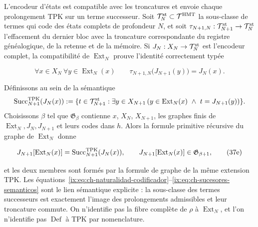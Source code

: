 L’encodeur d’états est compatible avec les troncatures et envoie chaque
prolongement TPK sur un terme successeur. Soit
\(\mathcal T_N^{\rm st}\subset\mathcal T^{\rm HMT}\) la sous-classe de termes
qui code des états complets de profondeur \(N\), et soit
\(\tau_{N+1,N}:\mathcal T_{N+1}^{\rm st}\to\mathcal T_N^{\rm st}\) l’effacement
du dernier bloc avec la troncature correspondante du registre généalogique,
de la retenue et de la mémoire. Si \(J_N:X_N\to\mathcal T_N^{\rm st}\) est l’encodeur
complet, la compatibilité de \(\operatorname{Ext}_N\) prouve l’identité
correctement typée

\[
 \forall x\in X_N\ \forall y\in\operatorname{Ext}_N(x)\qquad
 \tau_{N+1,N}\bigl(J_{N+1}(y)\bigr)=J_N(x).
\tag{37e$_0$}\label{ix:eq:ch-naturalidad-codificador}
\]

Définissons au sein de la sémantique
\[
 \operatorname{Succ}^{\rm TPK}_{N+1}(J_N(x)):=
 \{t\in\mathcal T_{N+1}^{\rm st}:\exists y\in X_{N+1}\,
   (y\in\operatorname{Ext}_N(x)\ \wedge\ t=J_{N+1}(y))\}.
\]
Choisissons \(\beta\) tel que \(\mathfrak G_\beta\) contienne \(x\), \(X_N\),
\(X_{N+1}\), les graphes finis de
\(\operatorname{Ext}_N,J_N,J_{N+1}\) et leurs codes dans \(h\). Alors la
formule primitive récursive du graphe de \(\operatorname{Ext}_N\) donne

\[
 J_{N+1}[\operatorname{Ext}_N(x)]
 =\operatorname{Succ}^{\rm TPK}_{N+1}(J_N(x)),
 \qquad
 J_{N+1}[\operatorname{Ext}_N(x)]
 \in\mathfrak G_{\beta+1},
\tag{37e}\label{ix:eq:ch-sucesores-semanticos}
\]

et les deux membres sont formés par la formule de graphe de la même extension
TPK. Les équations~\eqref{ix:eq:ch-naturalidad-codificador}--\eqref{ix:eq:ch-sucesores-semanticos} sont le lien sémantique explicite : la
sous-classe des termes successeurs est exactement l’image des prolongements
admissibles et leur troncature commute. On n’identifie pas la fibre complète de
\(\rho\) à \(\operatorname{Ext}_N\), et l’on n’identifie pas
\(\operatorname{Def}\) à TPK par nomenclature.

